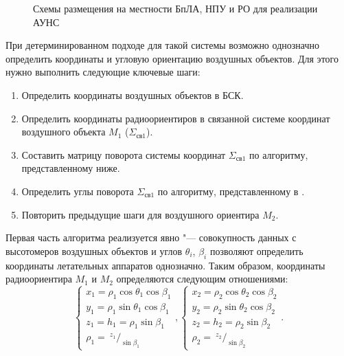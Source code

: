 \documentclass[../main.tex]{subfiles}
\begin{document}
\begin{figure}[htbp]
    \begin{center}


    \caption{Схемы размещения на местности БпЛА, НПУ и РО для реализации АУНС}
    \label{fig:systems:pic3}
    \end{center}
\end{figure}

При детерминированном подходе для такой системы возможно однозначно определить координаты и угловую ориентацию воздушных объектов. Для этого нужно выполнить следующие ключевые шаги:
\begin{enumerate}
    \item Определить координаты воздушных объектов в БСК.
    \item Определить координаты радиоориентиров в связанной системе координат воздушного объекта $M_1$ ($\Sigma_{\text{св}1}$).
    \item Составить матрицу поворота системы координат $\Sigma_{\text{св}1}$ по алгоритму, представленному ниже.
    \item Определить углы поворота $\Sigma_{\text{св}1}$ по алгоритму, представленному в \cite{antennas}.
    \item Повторить предыдущие шаги для воздушного ориентира $M_2$.
\end{enumerate}

Первая часть алгоритма реализуется явно "--- совокупность данных с высотомеров воздушных объектов и углов $\theta_i$, $\beta_i$ позволяют определить координаты летательных аппаратов однозначно. Таким образом, координаты радиоориентира $M_1$ и $M_2$ определяются следующим отношениями:
\begin{equation}
    \begin{cases}
        x_1 = \rho_1 \cos\theta_1 \cos\beta_1 \\
        y_1 = \rho_1 \sin\theta_1 \cos\beta_1 \\
        z_1 = h_1 = \rho_1 \sin\beta_1 \\
        \rho_1 = ~^{z_1}/_{\sin\beta_1}
    \end{cases},
    \begin{cases}
        x_2 = \rho_2 \cos\theta_2 \cos\beta_2 \\
        y_2 = \rho_2 \sin\theta_2 \cos\beta_2 \\
        z_2 = h_2 = \rho_2 \sin\beta_2 \\
        \rho_2 = ~^{z_2}/_{\sin\beta_2}
    \end{cases}.
\end{equation}
\end{document}
